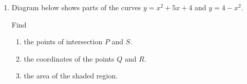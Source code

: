 \documentclass{report}
\begin{document}
\begin{multicols*}{2}
\begin{enumerate}
        \item Diagram below shows parts of the curves $y = x^2 + 5x + 4$ and $y = 4 - x^2$.

              Find
              \begin{enumerate}
                  \item the points of intersection $P$ and $S$.

                  \item the coordinates of the points $Q$ and $R$.

                  \item the area of the shaded region.
              \end{enumerate}
    \end{enumerate}
\end{multicols*}
\end{document}
